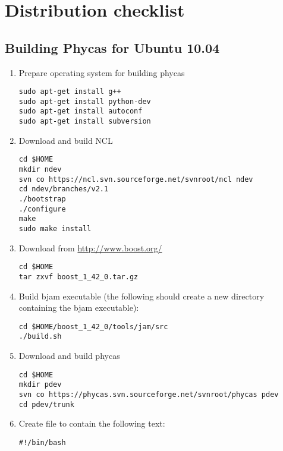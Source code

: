\chapter{Distribution checklist} 

\section{Building Phycas for Ubuntu 10.04}

\begin{enumerate}
\item Prepare operating system for building phycas
\begin{verbatim}
sudo apt-get install g++
sudo apt-get install python-dev
sudo apt-get install autoconf
sudo apt-get install subversion
\end{verbatim}
%
\item Download and build NCL
\begin{verbatim}
cd $HOME
mkdir ndev
svn co https://ncl.svn.sourceforge.net/svnroot/ncl ndev
cd ndev/branches/v2.1
./bootstrap
./configure
make
sudo make install
\end{verbatim}
%
\item Download  from \url{http://www.boost.org/}
\begin{verbatim}
cd $HOME
tar zxvf boost_1_42_0.tar.gz
\end{verbatim}
%
\item Build bjam executable (the following should create a new directory  containing the bjam executable):
\begin{verbatim}
cd $HOME/boost_1_42_0/tools/jam/src
./build.sh
\end{verbatim}
%
\item Download and build phycas
\begin{verbatim}
cd $HOME
mkdir pdev
svn co https://phycas.svn.sourceforge.net/svnroot/phycas pdev
cd pdev/trunk
\end{verbatim}
%
\item Create file  to contain the following text:
\begin{verbatim}
#!/bin/bash


\end{verbatim}
\end{enumerate}
